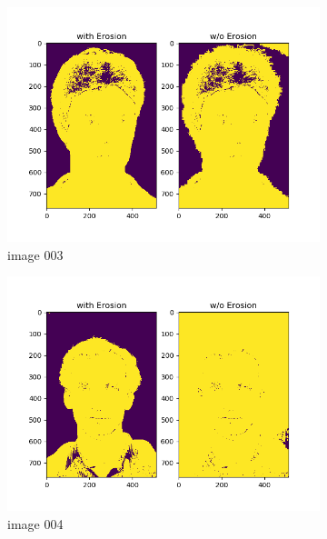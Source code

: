 \documentclass[11pt]{report}
\begin{document}
\begin{figure}[H]
\begin{subfigure}{0.4\textwidth}
        \centering
        \includegraphics[width=\textwidth]{Task 2 Plots/skin_color_mask_erode_003.png}
        \caption{image 003}
        \label{fig:skin_colormask_erode3}
    \end{subfigure}
    \begin{subfigure}{0.4\textwidth}
        \centering
        \includegraphics[width=\textwidth]{Task 2 Plots/skin_color_mask_erode_004.png}
        \caption{image 004}
        \label{fig:skin_colormask_erode4}
    \end{subfigure}
    \begin{subfigure}{0.3\textwidth}
        \centering

\end{subfigure}
\end{figure}
\end{document}
